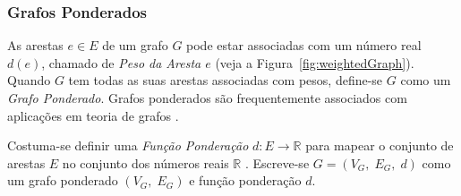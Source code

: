 \subsubsection{Grafos Ponderados}

As arestas $e\in E$ de um grafo $G$ pode estar associadas com um número real $d(e)$, chamado de \textit{Peso da Aresta $e$} (veja a Figura~\ref{fig:weightedGraph}). Quando $G$ tem todas as suas arestas associadas com pesos, define-se $G$ como um \textit{Grafo Ponderado}. Grafos ponderados são frequentemente associados com aplicações em teoria de grafos \cite{grafosPremioElon}.

Costuma-se definir uma \textit{Função Ponderação} $d: E \longrightarrow \mathbb{R}$ para mapear o conjunto de arestas $E$ no conjunto dos números reais $\mathbb{R}$ \cite{libertiEDG}. Escreve-se $G = (V_G,\;E_G,\;d)$ como um grafo ponderado $(V_G,\; E_G)$ e função ponderação $d$.



